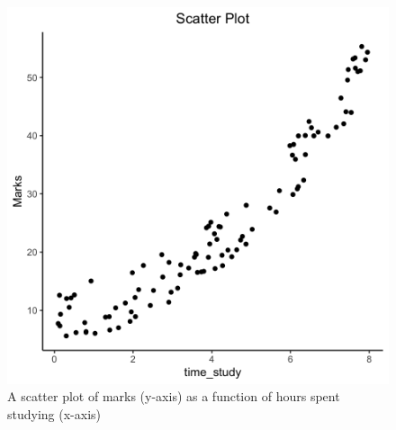 \documentclass{article}
\begin{document}
\begin{figure}[h]
\centering
    \includegraphics[width=0.4\linewidth]{imgs/Scatter_Plot.png}
    \caption{A scatter plot of marks (y-axis) as a function of hours spent studying (x-axis) }
    \label{fig:scatterplot}
\end{figure}
\end{document}
